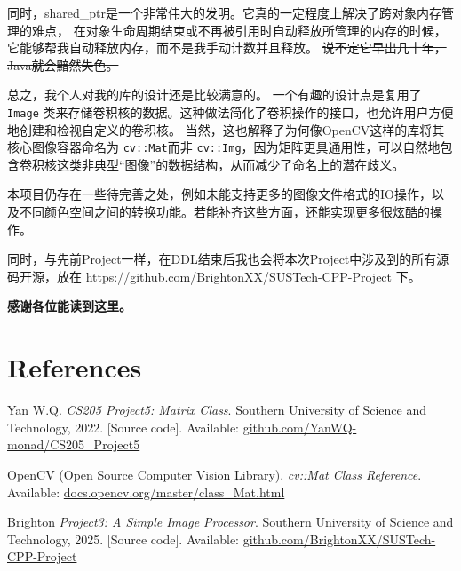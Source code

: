\documentclass[11pt]{article}
\begin{document}
同时，shared\_ptr是一个非常伟大的发明。它真的一定程度上解决了跨对象内存管理的难点，
在对象生命周期结束或不再被引用时自动释放所管理的内存的时候，它能够帮我自动释放内存，而不是我手动计数并且释放。
\sout{说不定它早出几十年，Java就会黯然失色。}


总之，我个人对我的库的设计还是比较满意的。
一个有趣的设计点是复用了 \texttt{Image} 类来存储卷积核的数据。这种做法简化了卷积操作的接口，也允许用户方便地创建和检视自定义的卷积核。
当然，这也解释了为何像OpenCV这样的库将其核心图像容器命名为 \texttt{cv::Mat}而非 \texttt{cv::Img}，因为矩阵更具通用性，可以自然地包含卷积核这类非典型“图像”的数据结构，从而减少了命名上的潜在歧义。


本项目仍存在一些待完善之处，例如未能支持更多的图像文件格式的IO操作，以及不同颜色空间之间的转换功能。若能补齐这些方面，还能实现更多很炫酷的操作。


同时，与先前Project一样，在DDL结束后我也会将本次Project中涉及到的所有源码开源，放在 https://github.com/BrightonXX/SUSTech-CPP-Project 下。


\textbf{感谢各位能读到这里。}
\newpage %
\section*{References}
\begin{thebibliography}{9}

Yan W.Q. \textit{CS205 Project5: Matrix Class}. 
Southern University of Science and Technology, 2022. 
[Source code]. Available: 
\href{https://github.com/YanWQ-monad/SUSTech_CS205_Projects}{github.com/YanWQ-monad/CS205\_Project5} 

OpenCV (Open Source Computer Vision Library). \textit{cv::Mat Class Reference}.
Available: \href{https://docs.opencv.org/3.4/d3/d63/classcv_1_1Mat.htmll}{docs.opencv.org/master/class\_Mat.html}

 Brighton 
\textit{Project3: A Simple Image Processor}. 
Southern University of Science and Technology, 2025. 
[Source code]. Available: 
\href{https://github.com/BrightonXX/SUSTech-CPP-Project}{github.com/BrightonXX/SUSTech-CPP-Project} 

\end{thebibliography}
\end{document}
